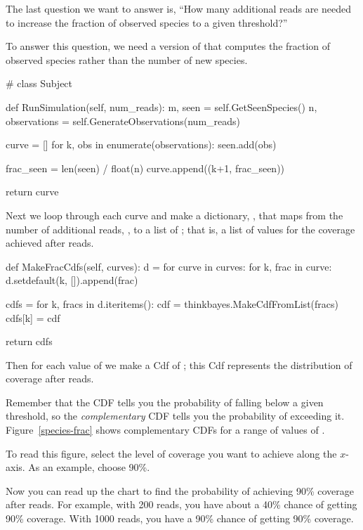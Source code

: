 \documentclass[12pt]{book}
\theoremstyle{exercise}
\begin{document}
The last question we want to answer is, ``How many additional reads
are needed to increase the fraction of observed species to a given
threshold?''

To answer this question, we need a version of 
that computes the fraction of observed species rather than the
number of new species.

\begin{code}
# class Subject

    def RunSimulation(self, num_reads):
        m, seen = self.GetSeenSpecies()
        n, observations = self.GenerateObservations(num_reads)

        curve = []
        for k, obs in enumerate(observations):
            seen.add(obs)

            frac_seen = len(seen) / float(n)
            curve.append((k+1, frac_seen))

        return curve
\end{code}

Next we loop through each curve and make a dictionary, ,
that maps from the number of additional reads, , to
a list of ; that is, a list of values for the
coverage achieved after  reads.

\begin{code}
    def MakeFracCdfs(self, curves):
        d = {}
        for curve in curves:
            for k, frac in curve:
                d.setdefault(k, []).append(frac)

        cdfs = {}
        for k, fracs in d.iteritems():
            cdf = thinkbayes.MakeCdfFromList(fracs)
            cdfs[k] = cdf

        return cdfs
\end{code}

Then for each value of  we make a Cdf of ; this Cdf
represents the distribution of coverage after  reads.

Remember that the CDF tells you the probability of falling below a
given threshold, so the {\em complementary} CDF tells you the
probability of exceeding it.  Figure~\ref{species-frac} shows
complementary CDFs for a range of values of .

To read this figure, select the level of coverage you want to achieve
along the $x$-axis.  As an example, choose 90\%.

Now you can read up the chart to find the probability of achieving
90\% coverage after  reads.  For example, with 200 reads,
you have about a 40\% chance of getting 90\% coverage.  With 1000 reads, you
have a 90\% chance of getting 90\% coverage.
\end{document}
